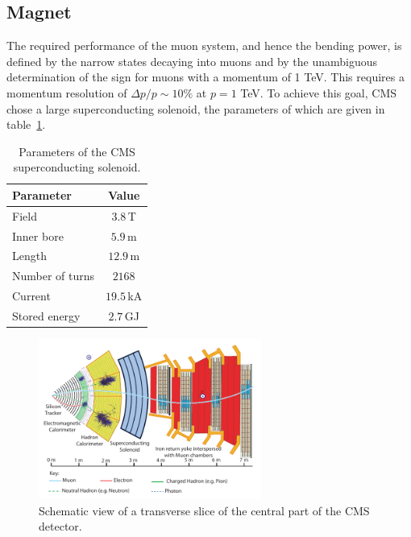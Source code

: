 \subsection{Magnet}
The required performance of the muon system, and hence the bending power, is defined by the narrow states decaying into muons and by the unambiguous determination of the sign for muons with a momentum of 1 TeV. This requires a momentum resolution of $\Delta p / p \sim 10\%$ at $p = 1$ TeV.  To achieve this goal, CMS chose a large superconducting solenoid, the parameters of which are given in table~\ref{tab:magnetParameters}. 
\begin{table}[h!]
\centering

 \begin{tabular}{ l  c }
\toprule
Parameter & Value \\
  \midrule
  Field & $3.8\,$T \\
  Inner bore & $5.9 \,$m \\
  Length & $12.9 \,$m \\
  Number of turns & $2168$ \\
  Current & $19.5 \,$kA \\
  Stored energy & $2.7 \,$GJ\\
  \bottomrule
 \end{tabular}
 \caption{Parameters of the CMS superconducting solenoid.}
\label{tab:magnetParameters}
\end{table}
\begin{figure}[h!]
 \centering
 \includegraphics[width=0.65\textwidth]{Images/cms_slice.pdf}
 \caption{Schematic view of a transverse slice of the central part of the CMS detector.}
\label{fig:cmsSection}
\end{figure}
 
